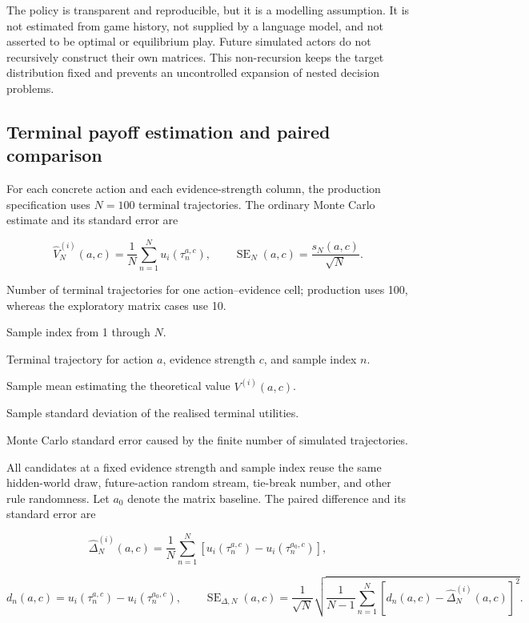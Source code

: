 \documentclass[11pt,a4paper]{article}
\begin{document}
The policy is transparent and reproducible, but it is a modelling assumption. It is not estimated from game history, not supplied by a language model, and not asserted to be optimal or equilibrium play. Future simulated actors do not recursively construct their own matrices. This non-recursion keeps the target distribution fixed and prevents an uncontrolled expansion of nested decision problems.

\subsection{Terminal payoff estimation and paired comparison}

For each concrete action and each evidence-strength column, the production specification uses $N=100$ terminal trajectories. The ordinary Monte Carlo estimate and its standard error are

\[
\widehat V_N^{(i)}(a,c)=\frac{1}{N}\sum_{n=1}^{N}u_i(\tau_n^{a,c}),
\qquad
\operatorname{SE}_N(a,c)=\frac{s_N(a,c)}{\sqrt N}.
\]

\begin{description}[style=nextline,leftmargin=3.4cm,labelwidth=3.0cm]
  \item[$N$] Number of terminal trajectories for one action--evidence cell; production uses 100, whereas the exploratory matrix cases use 10.
  \item[$n$] Sample index from 1 through $N$.
  \item[$\tau_n^{a,c}$] Terminal trajectory for action $a$, evidence strength $c$, and sample index $n$.
  \item[$\widehat V_N^{(i)}(a,c)$] Sample mean estimating the theoretical value $V^{(i)}(a,c)$.
  \item[$s_N(a,c)$] Sample standard deviation of the realised terminal utilities.
  \item[$\operatorname{SE}_N(a,c)$] Monte Carlo standard error caused by the finite number of simulated trajectories.
\end{description}

All candidates at a fixed evidence strength and sample index reuse the same hidden-world draw, future-action random stream, tie-break number, and other rule randomness. Let $a_0$ denote the matrix baseline. The paired difference and its standard error are

\[
\widehat\Delta_N^{(i)}(a,c)
=\frac{1}{N}\sum_{n=1}^{N}
\left[u_i(\tau_n^{a,c})-u_i(\tau_n^{a_0,c})\right],
\]

\[
d_n(a,c)=u_i(\tau_n^{a,c})-u_i(\tau_n^{a_0,c}),
\qquad
\operatorname{SE}_{\Delta,N}(a,c)
=\frac{1}{\sqrt N}
\sqrt{\frac{1}{N-1}\sum_{n=1}^{N}
\left[d_n(a,c)-\widehat\Delta_N^{(i)}(a,c)\right]^2}.
\]
\end{document}
